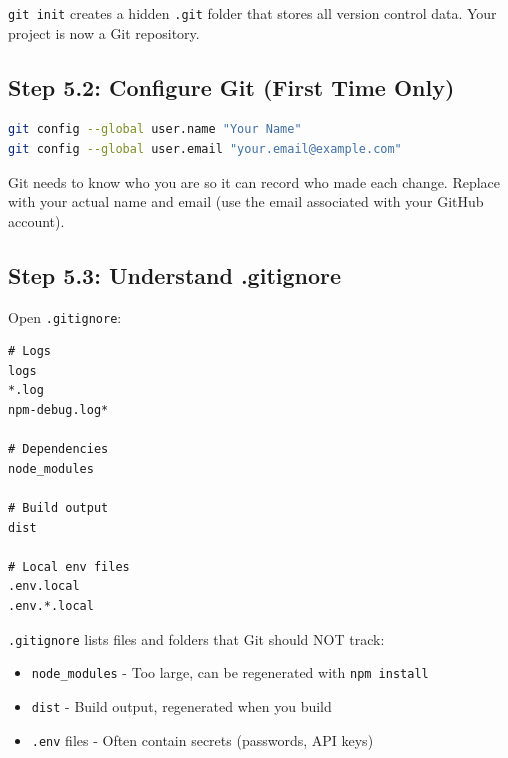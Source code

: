 \documentclass[12pt,a4paper]{article}
\begin{document}
\begin{explanation}
\texttt{git init} creates a hidden \texttt{.git} folder that stores all version control data. Your project is now a Git repository.
\end{explanation}

\subsection{Step 5.2: Configure Git (First Time Only)}

\begin{lstlisting}[language=bash,caption={Set your identity}]
git config --global user.name "Your Name"
git config --global user.email "your.email@example.com"
\end{lstlisting}

\begin{explanation}
Git needs to know who you are so it can record who made each change. Replace with your actual name and email (use the email associated with your GitHub account).
\end{explanation}

\subsection{Step 5.3: Understand .gitignore}

Open \texttt{.gitignore}:

\begin{lstlisting}[caption={.gitignore (partial)}]
# Logs
logs
*.log
npm-debug.log*

# Dependencies
node_modules

# Build output
dist

# Local env files
.env.local
.env.*.local
\end{lstlisting}

\begin{explanation}
\texttt{.gitignore} lists files and folders that Git should NOT track:
\begin{itemize}
    \item \texttt{node\_modules} - Too large, can be regenerated with \texttt{npm install}
    \item \texttt{dist} - Build output, regenerated when you build
    \item \texttt{.env} files - Often contain secrets (passwords, API keys)
\end{itemize}
\end{explanation}
\end{document}
